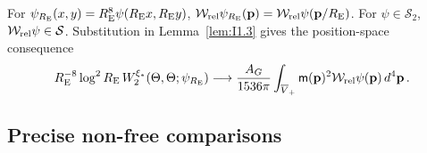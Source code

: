 For $\psi_{R_{\rm E}}(x,y)=R_{\rm E}^8\psi(R_{\rm E}x,R_{\rm E}y)$, $\mathcal{W}_{\mathrm{rel}}\psi_{R_{\rm E}}(\mathbf p)=\mathcal{W}_{\mathrm{rel}}\psi(\mathbf p/R_{\rm E})$. For $\psi\in\mathcal S_2$, $\mathcal{W}_{\mathrm{rel}}\psi\in\mathcal S$. Substitution in Lemma~\ref{lem:I1.3} gives the position-space consequence
\begin{equation*}
R_{\rm E}^{-8}\log^2R_{\rm E}\,W_2^{\xi_*}(\Theta,\Theta;\psi_{R_{\rm E}})
\longrightarrow\frac{A_G}{1536\pi}\int_{\overline{V}_+}\mathsf{m}(\mathbf p)^2\mathcal{W}_{\mathrm{rel}}\psi(\mathbf p)\,d^4\mathbf p\,.
\end{equation*}

\subsection{Precise non-free comparisons}\label{sec:partII-I.2}

